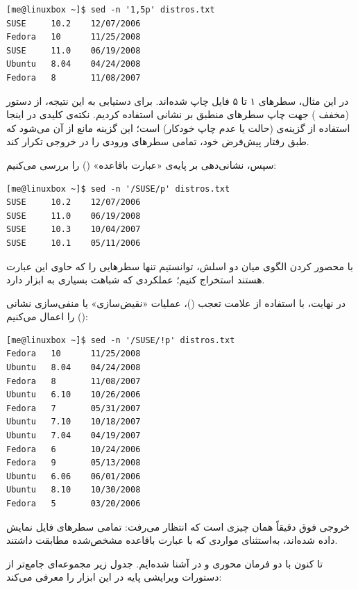 \begin{latin}
\begin{lstlisting}
[me@linuxbox ~]$ sed -n '1,5p' distros.txt
SUSE     10.2    12/07/2006
Fedora   10      11/25/2008
SUSE     11.0    06/19/2008
Ubuntu   8.04    04/24/2008
Fedora   8       11/08/2007
\end{lstlisting}
\end{latin}

در این مثال، سطرهای ۱ تا ۵ فایل چاپ شده‌اند. برای دستیابی به این نتیجه، از دستور  (مخفف ) جهت چاپ سطرهای منطبق بر نشانی استفاده کردیم. نکته‌ی کلیدی در اینجا استفاده از گزینه‌ی  (حالت  یا عدم چاپ خودکار) است؛ این گزینه مانع از آن می‌شود که  طبق رفتار پیش‌فرض خود، تمامی سطرهای ورودی را در خروجی تکرار کند.

سپس، نشانی‌دهی بر پایه‌ی «عبارت باقاعده» () را بررسی می‌کنیم:

\begin{latin}
\begin{lstlisting}
[me@linuxbox ~]$ sed -n '/SUSE/p' distros.txt
SUSE     10.2    12/07/2006
SUSE     11.0    06/19/2008
SUSE     10.3    10/04/2007
SUSE     10.1    05/11/2006
\end{lstlisting}
\end{latin}

با محصور کردن الگوی  میان دو اسلش، توانستیم تنها سطرهایی را که حاوی این عبارت هستند استخراج کنیم؛ عملکردی که شباهت بسیاری به ابزار  دارد.

در نهایت، با استفاده از علامت تعجب (\cmd{!})، عملیات «نقیض‌سازی» یا منفی‌سازی نشانی () را اعمال می‌کنیم:

\begin{latin}
\begin{lstlisting}
[me@linuxbox ~]$ sed -n '/SUSE/!p' distros.txt
Fedora   10      11/25/2008
Ubuntu   8.04    04/24/2008
Fedora   8       11/08/2007
Ubuntu   6.10    10/26/2006
Fedora   7       05/31/2007
Ubuntu   7.10    10/18/2007
Ubuntu   7.04    04/19/2007
Fedora   6       10/24/2006
Fedora   9       05/13/2008
Ubuntu   6.06    06/01/2006
Ubuntu   8.10    10/30/2008
Fedora   5       03/20/2006
\end{lstlisting}
\end{latin}

خروجی فوق دقیقاً همان چیزی است که انتظار می‌رفت: تمامی سطرهای فایل نمایش داده شده‌اند، به‌استثنای مواردی که با عبارت باقاعده مشخص‌شده مطابقت داشتند.

تا کنون با دو فرمان محوری  و  در  آشنا شده‌ایم. جدول زیر مجموعه‌ای جامع‌تر از دستورات ویرایشی پایه در این ابزار را معرفی می‌کند:

